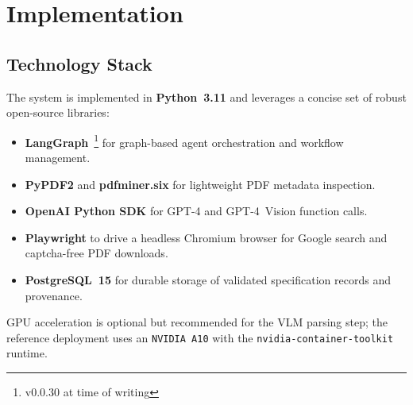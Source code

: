 \chapter{Implementation}
\label{chapter:implementation}

\section{Technology Stack}
The system is implemented in \textbf{Python~3.11} and leverages a concise set of robust open-source libraries:
\begin{itemize}
  \item \textbf{LangGraph}~\footnote{v0.0.30 at time of writing} for graph-based agent orchestration and workflow management.
  \item \textbf{PyPDF2} and \textbf{pdfminer.six} for lightweight PDF metadata inspection.
  \item \textbf{OpenAI Python SDK} for GPT-4 and GPT-4~Vision function calls.
  \item \textbf{Playwright} to drive a headless Chromium browser for Google search and captcha-free PDF downloads.
  \item \textbf{PostgreSQL~15} for durable storage of validated specification records and provenance.
\end{itemize}
GPU acceleration is optional but recommended for the VLM parsing step; the reference deployment uses an \texttt{NVIDIA~A10} with the \texttt{nvidia-container-toolkit} runtime.

